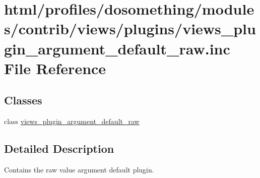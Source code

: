\hypertarget{views__plugin__argument__default__raw_8inc}{
\section{html/profiles/dosomething/modules/contrib/views/plugins/views\_\-plugin\_\-argument\_\-default\_\-raw.inc File Reference}
\label{views__plugin__argument__default__raw_8inc}
}
\subsection*{Classes}
\begin{DoxyCompactItemize}
\item 
class \hyperlink{classviews__plugin__argument__default__raw}{views\_\-plugin\_\-argument\_\-default\_\-raw}
\end{DoxyCompactItemize}


\subsection{Detailed Description}
Contains the raw value argument default plugin. 